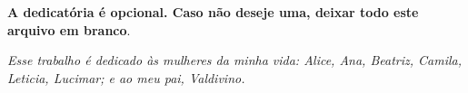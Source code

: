 \begin{dedicatoria}
   \vspace*{\fill}
   \centering
   \noindent
	\textbf{A dedicatória é opcional. Caso não deseje uma, deixar todo este
	arquivo em branco}.

   \textit{Esse trabalho é dedicado às mulheres da minha vida: Alice, Ana, Beatriz, Camila, Leticia, Lucimar; e ao meu pai, Valdivino.} \vspace*{\fill}
\end{dedicatoria}
